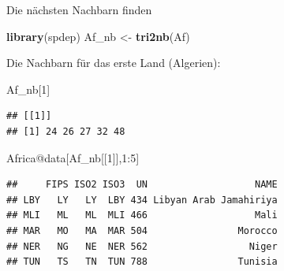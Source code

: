 \documentclass[ignorenonframetext,]{beamer}
\newenvironment{Shaded}{\begin{snugshade}}{\end{snugshade}}
\newcommand{\DecValTok}[1]{\textcolor[rgb]{0.27,0.67,0.26}{#1}}
\newcommand{\KeywordTok}[1]{\textcolor[rgb]{0.26,0.66,0.93}{\textbf{#1}}}
\newcommand{\NormalTok}[1]{\textcolor[rgb]{0.74,0.68,0.62}{#1}}
\newcommand{\OperatorTok}[1]{\textcolor[rgb]{0.74,0.68,0.62}{#1}}
\newcommand{\StringTok}[1]{\textcolor[rgb]{0.02,0.61,0.04}{#1}}
\begin{document}
\begin{frame}[fragile]{Die nächsten Nachbarn finden}
\protect\hypertarget{die-nachsten-nachbarn-finden}{}

\begin{Shaded}
\begin{Highlighting}[]
\KeywordTok{library}\NormalTok{(spdep)}
\NormalTok{Af_nb <-}\StringTok{ }\KeywordTok{tri2nb}\NormalTok{(Af)}
\end{Highlighting}
\end{Shaded}

Die Nachbarn für das erste Land (Algerien):

\begin{Shaded}
\begin{Highlighting}[]
\NormalTok{Af_nb[}\DecValTok{1}\NormalTok{]}
\end{Highlighting}
\end{Shaded}

\begin{verbatim}
## [[1]]
## [1] 24 26 27 32 48
\end{verbatim}

\begin{Shaded}
\begin{Highlighting}[]
\NormalTok{Africa}\OperatorTok{@}\NormalTok{data[Af_nb[[}\DecValTok{1}\NormalTok{]],}\DecValTok{1}\OperatorTok{:}\DecValTok{5}\NormalTok{]}
\end{Highlighting}
\end{Shaded}

\begin{verbatim}
##     FIPS ISO2 ISO3  UN                   NAME
## LBY   LY   LY  LBY 434 Libyan Arab Jamahiriya
## MLI   ML   ML  MLI 466                   Mali
## MAR   MO   MA  MAR 504                Morocco
## NER   NG   NE  NER 562                  Niger
## TUN   TS   TN  TUN 788                Tunisia
\end{verbatim}

\end{frame}
\end{document}
